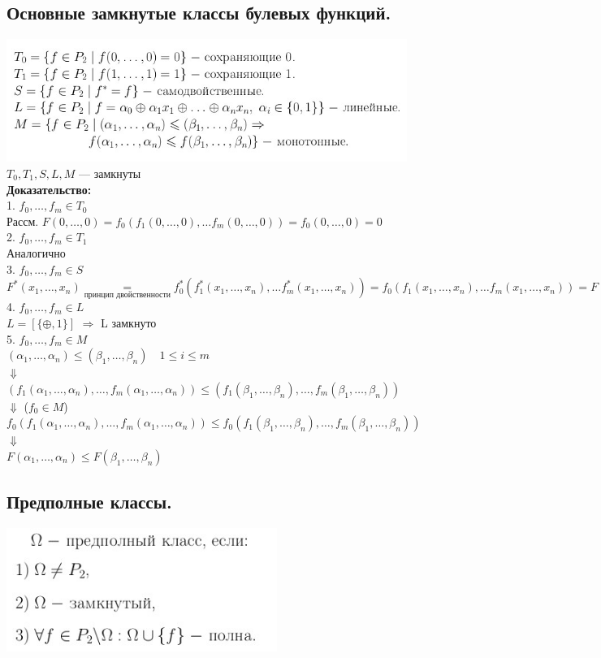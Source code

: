 \documentclass[12pt]{article}
\begin{document}
\subsection{Основные замкнутые классы булевых функций.}
	\includegraphics[width=370pt]{25}\\
	$T_0, T_1, S, L, M$ — замкнуты\\
	\textbf{Доказательство:}\\
		1. $f_0, \dotsc, f_m \in T_0$\\
		Рассм. $F(0,\dotsc,0) = f_0(f_1(0,\dotsc,0),\dotsc f_m(0,\dotsc,0)) = f_0(0,\dotsc,0) = 0$\\
		2. $f_0, \dotsc, f_m \in T_1$\\
		Аналогично\\
		3. $f_0, \dotsc, f_m \in S$\\
		$F^*(x_1,\dotsc,x_n) \underset{\text{принцип двойственности}}{=} f_0^*(f_1^*(x_1,\dotsc,x_n),\dotsc f_m^*(x_1,\dotsc,x_n)) = f_0(f_1(x_1,\dotsc,x_n),\dotsc f_m(x_1,\dotsc,x_n)) = F(x_1,\dotsc,x_n)$\\
		4. $f_0, \dotsc, f_m \in L$\\
		$L = [\{\oplus, 1\}]$ $\Rightarrow$ L замкнуто\\
		5. $f_0, \dotsc, f_m \in M$\\
		$(\alpha_1,\dotsc,\alpha_n) \leqslant (\beta_1,\dotsc,\beta_n) \quad 1 \leqslant i \leqslant m$\\
		$\Downarrow$\\
		$(f_1(\alpha_1,\dotsc,\alpha_n),\dotsc,f_m(\alpha_1,\dotsc,\alpha_n)) \leqslant (f_1(\beta_1,\dotsc,\beta_n),\dotsc,f_m(\beta_1,\dotsc,\beta_n))$\\
		$\Downarrow$ ($f_0 \in M$)\\
		$f_0(f_1(\alpha_1,\dotsc,\alpha_n),\dotsc,f_m(\alpha_1,\dotsc,\alpha_n)) \leqslant f_0(f_1(\beta_1,\dotsc,\beta_n),\dotsc,f_m(\beta_1,\dotsc,\beta_n))$\\
		$\Downarrow$\\
		$F(\alpha_1,\dotsc,\alpha_n) \leqslant F(\beta_1,\dotsc,\beta_n)$\\
	\qedsymbol
\subsection{Предполные классы.}
	\includegraphics[width=250pt]{26}
\end{document}
